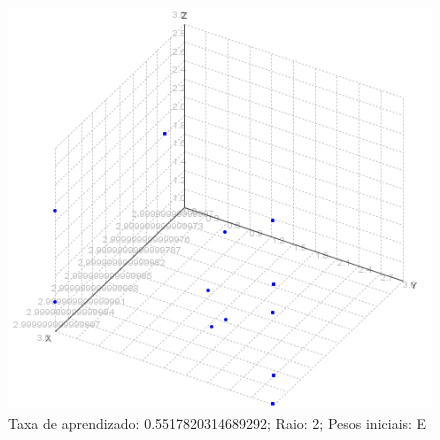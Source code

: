 \newpage
\begin{figure}[ht!]
	\centering
	\includegraphics[scale=0.65]{./imgs/2e2.png}
	\caption{Taxa de aprendizado: 0.5517820314689292; Raio: 2; Pesos iniciais: E}
\end{figure}

